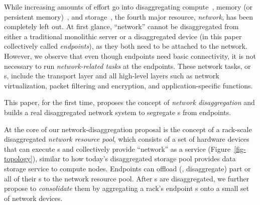 While increasing amounts of effort go into disaggregating compute~\cite{LegoOS,disagg-gpu}, memory (or persistent memory)~\cite{LegoOS,HP-TheMachine,Lim09-disaggregate,remote-region-atc18,ATC20-pDPM,semeru,infiniswap,fastswap,hotpot-socc17}, and storage~\cite{PolarFS-VLDB18,SnowFlake-NSDI20,hailstorm-asplos20,ana-eurosys16,gimbal}, the fourth major resource, \textit{network}, has been completely left out.
At first glance, ``network'' cannot be disaggregated from either a traditional monolithic server or a disaggregated device (in this paper collectively called {\em endpoints}), as they both need to be attached to the network.        
However, we observe that even though endpoints need basic connectivity, it is not necessary to run {\em network-related tasks} at the endpoints.
These network tasks, or {\em \nt}s, include the transport layer and all high-level layers such as network virtualization, packet filtering and encryption, and application-specific functions.

This paper, for the first time, proposes the concept of {\em network disaggregation} and builds a real disaggregated network system to segregate \nt{}s from endpoints.

At the core of our network-disaggregation proposal is the concept of a rack-scale disaggregated {\em network resource pool}, which consists of a set of hardware devices that can execute \nt{}s and collectively provide ``network'' as a service (Figure~\ref{fig-topology}), similar to how today's disaggregated storage pool provides data storage service to compute nodes. 
Endpoints can offload (\ie, disaggregate) part or all of their \nt{}s to the network resource pool.
After \nt{}s are disaggregated, we further propose to {\em consolidate} them by aggregating a rack's endpoint \nt{}s onto a small set of network devices.

